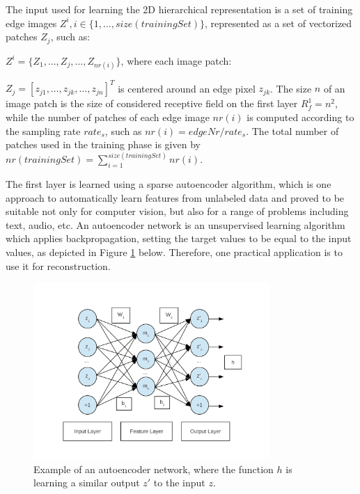 \documentclass[runningheads]{llncs}
\begin{document}
The input used for learning the 2D hierarchical representation is a set of training edge images $Z^i, i\in \{1,\ldots,size(trainingSet)\}$, represented as a set of vectorized patches $Z_j$, such as:

$Z^i=\{Z_1,\ldots,Z_j,\ldots,Z_{nr(i)}\}$, where each image patch: 

$Z_j=[z_{j1},\ldots,z_{jk},\ldots,z_{jn}]^T$ is centered around an edge pixel $z_{jk}$. The size $n$ of an image patch is the size of considered receptive field on the first layer $R_f^1=n^2$, while the number of patches of each edge image $nr(i)$ is computed according to the sampling rate $rate_s$, such as $nr(i)=edgeNr/rate_s$. The total number of patches used in the training phase is given by $nr(trainingSet)=\sum_{i=1}^{size(trainingSet)}nr(i).$

The first layer is learned using a sparse autoencoder algorithm, which is one approach to automatically learn features from unlabeled data and proved to be suitable not only for computer vision, but also for a range of problems including text, audio, etc. An autoencoder network is an unsupervised learning algorithm which applies backpropagation, setting the target values to be equal to the input values, as depicted in Figure \ref{fig:autoencoder} below. Therefore, one practical application is to use it for reconstruction. 

\begin{figure}
\begin{center}
\includegraphics[width = 0.8\textwidth]{autoencoder}
\end{center}
\caption{Example of an autoencoder network, where the function $h$ is learning a similar output $z'$ to the input $z$.}
\label{fig:autoencoder}
\end{figure}
\end{document}
